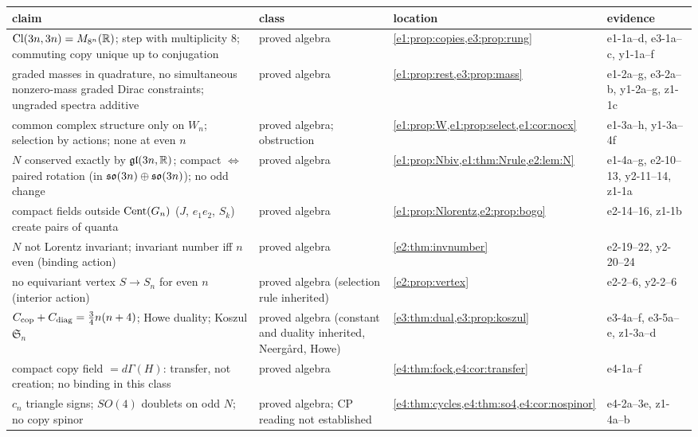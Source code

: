 \begin{table}[!htbp]
\centering
\footnotesize
\begin{tabular}{@{}>{\raggedright\arraybackslash}p{6.1cm}>{\raggedright\arraybackslash}p{2.4cm}>{\raggedright\arraybackslash}p{3.0cm}>{\raggedright\arraybackslash}p{3.0cm}@{}}
\toprule
claim & class & location & evidence\\
\midrule
$\mathrm{Cl}(3n,3n)=M_{8^n}(\mathbb{R})$; step with multiplicity $8$; commuting copy unique up to conjugation & proved algebra & \cref{e1:prop:copies,e3:prop:rung} & e1-1a--d, e3-1a--c, y1-1a--f\\
graded masses in quadrature, no simultaneous nonzero-mass graded Dirac constraints; ungraded spectra additive & proved algebra & \cref{e1:prop:rest,e3:prop:mass} & e1-2a--g, e3-2a--b, y1-2a--g, z1-1c\\
common complex structure only on $W_n$; selection by actions; none at even $n$ & proved algebra; obstruction & \cref{e1:prop:W,e1:prop:select,e1:cor:nocx} & e1-3a--h, y1-3a--4f\\
$N$ conserved exactly by $\mathfrak{gl}(3n,\mathbb{R})$; compact $\Leftrightarrow$ paired rotation (in $\mathfrak{so}(3n)\oplus\mathfrak{so}(3n)$); no odd change & proved algebra & \cref{e1:prop:Nbiv,e1:thm:Nrule,e2:lem:N} & e1-4a--g, e2-10--13, y2-11--14, z1-1a\\
compact fields outside $\operatorname{Cent}(G_n)$ ($J$, $e_1e_2$, $S_k$) create pairs of quanta & proved algebra & \cref{e1:prop:Nlorentz,e2:prop:bogo} & e2-14--16, z1-1b\\
$N$ not Lorentz invariant; invariant number iff $n$ even (binding action) & proved algebra & \cref{e2:thm:invnumber} & e2-19--22, y2-20--24\\
no equivariant vertex $S\to S_n$ for even $n$ (interior action) & proved algebra (selection rule inherited) & \cref{e2:prop:vertex} & e2-2--6, y2-2--6\\
$C_{\rm cop}+C_{\rm diag}=\tfrac34n(n+4)$; Howe duality; Koszul $\mathfrak S_n$ & proved algebra (constant and duality inherited, Neerg{\aa}rd, Howe) & \cref{e3:thm:dual,e3:prop:koszul} & e3-4a--f, e3-5a--e, z1-3a--d\\
compact copy field $=d\Gamma(H)$: transfer, not creation; no binding in this class & proved algebra & \cref{e4:thm:fock,e4:cor:transfer} & e4-1a--f\\
$c_n$ triangle signs; $SO(4)$ doublets on odd $N$; no copy spinor & proved algebra; CP reading not established & \cref{e4:thm:cycles,e4:thm:so4,e4:cor:nospinor} & e4-2a--3e, z1-4a--b\\

\end{tabular}
\end{table}
